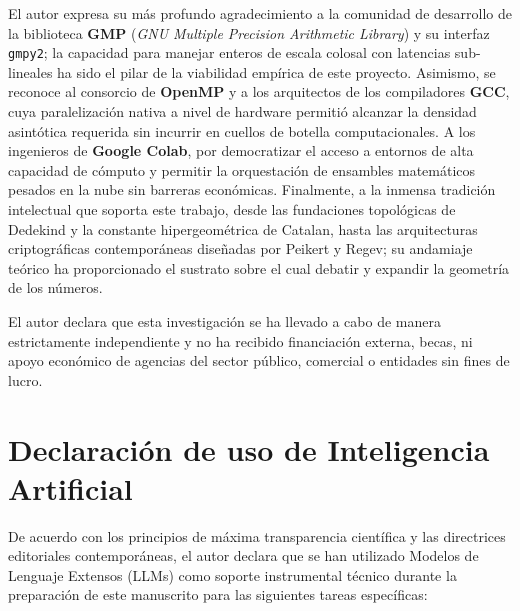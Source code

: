 \documentclass{article}
\numberwithin{equation}{section}
\theoremstyle{plain}
\theoremstyle{definition}
\begin{document}
\begin{ack}
El autor expresa su más profundo agradecimiento a la comunidad de desarrollo de la biblioteca \textbf{GMP} (\textit{GNU Multiple Precision Arithmetic Library}) y su interfaz \texttt{gmpy2}; la capacidad para manejar enteros de escala colosal con latencias sub-lineales ha sido el pilar de la viabilidad empírica de este proyecto. Asimismo, se reconoce al consorcio de \textbf{OpenMP} y a los arquitectos de los compiladores \textbf{GCC}, cuya paralelización nativa a nivel de hardware permitió alcanzar la densidad asintótica requerida sin incurrir en cuellos de botella computacionales. A los ingenieros de \textbf{Google Colab}, por democratizar el acceso a entornos de alta capacidad de cómputo y permitir la orquestación de ensambles matemáticos pesados en la nube sin barreras económicas. Finalmente, a la inmensa tradición intelectual que soporta este trabajo, desde las fundaciones topológicas de Dedekind y la constante hipergeométrica de Catalan, hasta las arquitecturas criptográficas contemporáneas diseñadas por Peikert y Regev; su andamiaje teórico ha proporcionado el sustrato sobre el cual debatir y expandir la geometría de los números.
\end{ack}

\begin{funding}
El autor declara que esta investigación se ha llevado a cabo de manera estrictamente independiente y no ha recibido financiación externa, becas, ni apoyo económico de agencias del sector público, comercial o entidades sin fines de lucro.
\end{funding}

\section*{Declaración de uso de Inteligencia Artificial}
De acuerdo con los principios de máxima transparencia científica y las directrices editoriales contemporáneas, el autor declara que se han utilizado Modelos de Lenguaje Extensos (LLMs) como soporte instrumental técnico durante la preparación de este manuscrito para las siguientes tareas específicas:
\end{document}
